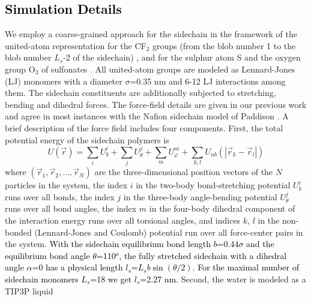 \documentclass[3p,english,preprint]{elsarticle}
\newcommand{\need}[1]{\textcolor{black}{#1}}
\newcommand{\mod}[1]{\textcolor{black}{#1}}
\newcommand{\mage}[1]{\textcolor{black}{#1}}
\begin{document}
{\mod{ 
\section{Simulation Details}
}}
 \label{section-details}
 
We employ a coarse-grained approach  for the sidechain
in the framework of the united-atom representation for the  CF$_{2}$
 groups (from the blob number 1 to the blob number $L_s$-2 of the sidechain) 
\cite{vishnyakov2001,yamamoto,allahyarov-2011-diff-archit}, 
and  for the sulphur   atom S and  the oxygen group O$_3$
of sulfonates  \cite{allahyarov-2011-diff-archit,allahyarov-dry-ionomer-2007}. 
 All united-atom groups are modeled as Lennard-Jones (LJ) monomers 
 with a diameter $\sigma$=0.35 nm and 
 6-12 LJ interactions among them. 
The sidechain constituents  are additionally subjected to stretching, bending  and dihedral
forces. The force-field details  are given in our previous work 
\cite{allahyarov-swelling-2009,allahyarov-2011-diff-archit,allahyarov-stretching-2009} and 
 agree in most instances with the Nafion sidechain 
model of Paddison \cite{Paddison1}.  A  brief description of the force field includes four components.
First, the total potential energy of the sidechain polymers  is 
\begin{equation}
U(\vec r) = \displaystyle\sum_{i}{U_b^i} +
\displaystyle\sum_{j}{U_{\theta}^j} + 
\displaystyle\sum_{m}{U_{\varphi}^m} + 
\displaystyle\sum_{k,l}{U_{nb}{\left( |\vec r_k -\vec r_l| \right)}} 
\label{eq1} 
\end{equation}
where $(\vec r_1, \vec r_2,...,\vec r_N)$ are the
three-dimensional position vectors of the $N$ particles in the system, 
the index $i$   in the two-body bond-stretching potential $U_b^i$ runs over all bonds, 
the index $j$   in the three-body angle-bending potential $U_{\theta}^j$ 
 runs over all bond angles, 
the index $m$  in the four-body dihedral component of the interaction energy runs
 over all torsional angles, 
and indices $k$, $l$ in the non-bonded (Lennard-Jones and Coulomb) 
potential run over all  force-center pairs in the system.
{\need{ 
 With the sidechain equilibrium bond length $b$=0.44$\sigma$ and the equilibrium bond angle 
$\theta$=110$^o$, the fully stretched sidechain with a dihedral angle $\alpha$=0 has 
a physical length $l_s$=$L_s b \sin(\theta/2)$. For the maximal number of sidechain monomers 
$L_s$=18 we get $l_s$=2.27 nm. 
}}  
Second, the water is modeled as a TIP3P liquid  
\end{document}
